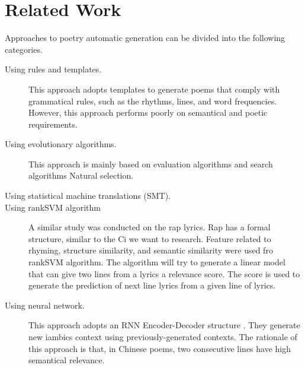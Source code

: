 \section{Related Work}  
Approaches to poetry automatic generation can be divided into the following categories.
\begin{description}
\item [Using rules and templates.] 
%
This approach adopts templates to generate poems that comply with grammatical rules, such as the rhythms, lines, and word frequencies\cite{wu2009new,tosa2008hitch}. 
%
However, this approach performs poorly on semantical and poetic requirements.
\item [Using evolutionary algorithms.] This approach is mainly based on evaluation algorithms and search algorithms
%
Natural selection.
\item [Using statistical machine translations (SMT).] 
\item [Using rankSVM algorithm]
A similar study was conducted on the rap lyrics\cite{malmi2015dopelearning}.  Rap has a formal structure, similar to the Ci we want to research. Feature related to rhyming, structure similarity, and semantic similarity were used fro rankSVM algorithm. The algorithm will try to generate a linear model that can give two lines from a lyrics a relevance score. The score is used to generate the prediction of next line lyrics from a given line of lyrics.
\item [Using neural network.]  This approach adopts an RNN Encoder-Decoder structure \cite{wang2016chinese,bahdanau2014neural}. 
%
They generate new iambics context using previously-generated contexts. The rationale of this approach is that, in Chinese poems, two consecutive lines have high semantical relevance.
\end{description}
